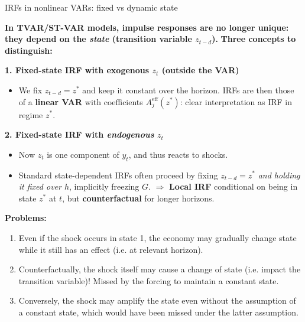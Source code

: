 \documentclass{beamer}
\begin{document}
\begin{frame}{IRFs in nonlinear VARs: fixed vs dynamic state}
\scriptsize

\textbf{In TVAR/ST-VAR models, impulse responses are no longer unique: they depend on the \emph{state} (transition variable $z_{t-d}$).} \textbf{Three concepts to distinguish:}

\medskip

\textbf{1. Fixed-state IRF with exogenous $z_t$ (outside the VAR)}
  \begin{itemize}
    \item We fix $z_{t-d}=z^\ast$ and keep it constant over the horizon. IRFs are then those of a \textbf{linear VAR} with coefficients $A_j^{\text{eff}}(z^\ast)$: clear interpretation as IRF in regime $z^\ast$.
  \end{itemize}

\textbf{2. Fixed-state IRF with \emph{endogenous} $z_t$}
  \begin{itemize}
    \item Now $z_t$ is one component of $y_t$, and thus reacts to shocks.
    \item Standard state-dependent IRFs often proceed by fixing $z_{t-d}=z^\ast$ \emph{and holding it fixed over $h$},
    implicitly freezing $G$. $\Rightarrow$ \textbf{Local IRF} conditional on being in state $z^\ast$ at $t$, but \textbf{counterfactual} for longer horizons.
    \end{itemize}
    
\textbf{Problems:}
\begin{enumerate}
    \item Even if the shock occurs in state 1, the economy may gradually change state while it still has an effect (i.e. at relevant horizon).
    \item Counterfactually, the shock itself may cause a change of state (i.e. impact the transition variable)! Missed by the forcing to maintain a constant state.
    \item Conversely, the shock may amplify the state even without the assumption of a constant state, which would have been missed under the latter assumption.
\end{enumerate}
\end{frame}
\end{document}
